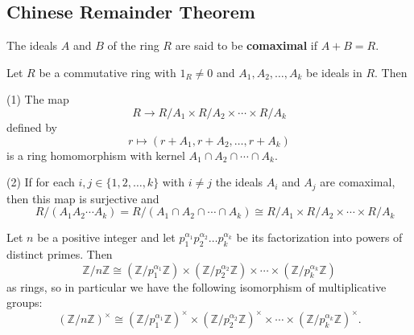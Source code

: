\subsection{Chinese Remainder Theorem}
\begin{definition}
    The ideals $A$ and $B$ of the ring $R$ are said to be \textbf{comaximal} if $A+B=R$.
\end{definition}


\begin{theorem}
    Let $R$ be a commutative ring with $1_R\neq 0$ and $A_1, A_2, \ldots, A_k$ be ideals in $R$. Then

    (1) The map
    \begin{equation*}
        R \rightarrow R / A_1 \times R / A_2 \times \cdots \times R / A_k\end{equation*}
    defined by
    \begin{equation*}
        r \mapsto\left(r+A_1, r+A_2, \ldots, r+A_k\right)
    \end{equation*}
    is a ring homomorphism with kernel $A_1 \cap A_2 \cap \cdots \cap A_k$.

    (2) If for each $i, j \in\{1,2, \ldots, k\}$ with $i \neq j$ the ideals $A_i$ and $A_j$ are comaximal, then this map is surjective and
    \begin{equation*}
        \quad R /\left(A_1 A_2 \cdots A_k\right)=R /\left(A_1 \cap A_2 \cap \cdots \cap A_k\right) \cong R / A_1 \times R / A_2 \times \cdots \times R / A_k
    \end{equation*}
\end{theorem}

\begin{corollary}
    Let $n$ be a positive integer and let $p_1^{\alpha_1} p_2^{\alpha_2} \ldots p_k^{\alpha_k}$ be its factorization into powers of distinct primes. Then
    \begin{equation*}
        \mathbb{Z} / n \mathbb{Z}
        \cong
        \left(\mathbb{Z} / p_1^{\alpha_1} \mathbb{Z}\right) \times\left(\mathbb{Z} / p_2^{\alpha_2} \mathbb{Z}\right) \times \cdots \times\left(\mathbb{Z} / p_k^{\alpha_k} \mathbb{Z}\right)
    \end{equation*}
    as rings, so in particular we have the following isomorphism of multiplicative groups:
    \begin{equation*}
        (\mathbb{Z} / n \mathbb{Z})^{\times} \cong\left(\mathbb{Z} / p_1^{\alpha_1} \mathbb{Z}\right)^{\times} \times\left(\mathbb{Z} / p_2^{\alpha_2} \mathbb{Z}\right)^{\times} \times \cdots \times\left(\mathbb{Z} / p_k^{\alpha_k} \mathbb{Z}\right)^{\times} .
    \end{equation*}
\end{corollary}




